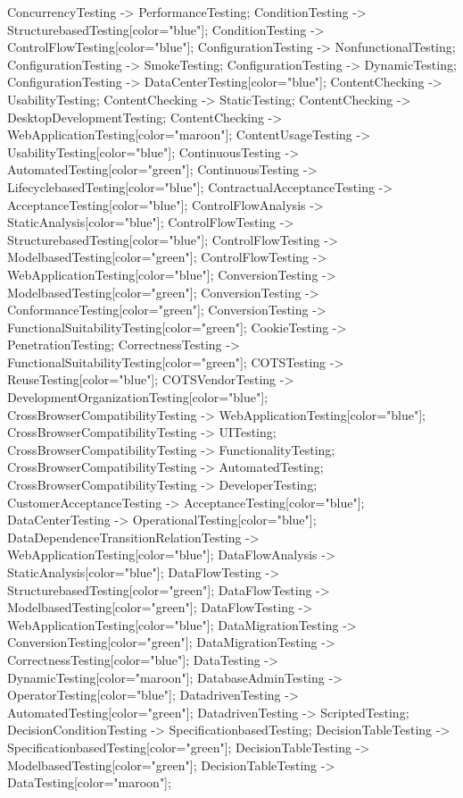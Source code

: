 \documentclass{article}
\begin{document}
{ConcurrencyTesting -> PerformanceTesting;
ConditionTesting -> StructurebasedTesting[color="blue"];
ConditionTesting -> ControlFlowTesting[color="blue"];
ConfigurationTesting -> NonfunctionalTesting;
ConfigurationTesting -> SmokeTesting;
ConfigurationTesting -> DynamicTesting;
ConfigurationTesting -> DataCenterTesting[color="blue"];
ContentChecking -> UsabilityTesting;
ContentChecking -> StaticTesting;
ContentChecking -> DesktopDevelopmentTesting;
ContentChecking -> WebApplicationTesting[color="maroon"];
ContentUsageTesting -> UsabilityTesting[color="blue"];
ContinuousTesting -> AutomatedTesting[color="green"];
ContinuousTesting -> LifecyclebasedTesting[color="blue"];
ContractualAcceptanceTesting -> AcceptanceTesting[color="blue"];
ControlFlowAnalysis -> StaticAnalysis[color="blue"];
ControlFlowTesting -> StructurebasedTesting[color="blue"];
ControlFlowTesting -> ModelbasedTesting[color="green"];
ControlFlowTesting -> WebApplicationTesting[color="blue"];
ConversionTesting -> ModelbasedTesting[color="green"];
ConversionTesting -> ConformanceTesting[color="green"];
ConversionTesting -> FunctionalSuitabilityTesting[color="green"];
CookieTesting -> PenetrationTesting;
CorrectnessTesting -> FunctionalSuitabilityTesting[color="green"];
COTSTesting -> ReuseTesting[color="blue"];
COTSVendorTesting -> DevelopmentOrganizationTesting[color="blue"];
CrossBrowserCompatibilityTesting -> WebApplicationTesting[color="blue"];
CrossBrowserCompatibilityTesting -> UITesting;
CrossBrowserCompatibilityTesting -> FunctionalityTesting;
CrossBrowserCompatibilityTesting -> AutomatedTesting;
CrossBrowserCompatibilityTesting -> DeveloperTesting;
CustomerAcceptanceTesting -> AcceptanceTesting[color="blue"];
DataCenterTesting -> OperationalTesting[color="blue"];
DataDependenceTransitionRelationTesting -> WebApplicationTesting[color="blue"];
DataFlowAnalysis -> StaticAnalysis[color="blue"];
DataFlowTesting -> StructurebasedTesting[color="green"];
DataFlowTesting -> ModelbasedTesting[color="green"];
DataFlowTesting -> WebApplicationTesting[color="blue"];
DataMigrationTesting -> ConversionTesting[color="green"];
DataMigrationTesting -> CorrectnessTesting[color="blue"];
DataTesting -> DynamicTesting[color="maroon"];
DatabaseAdminTesting -> OperatorTesting[color="blue"];
DatadrivenTesting -> AutomatedTesting[color="green"];
DatadrivenTesting -> ScriptedTesting;
DecisionConditionTesting -> SpecificationbasedTesting;
DecisionTableTesting -> SpecificationbasedTesting[color="green"];
DecisionTableTesting -> ModelbasedTesting[color="green"];
DecisionTableTesting -> DataTesting[color="maroon"];
}
\end{document}
